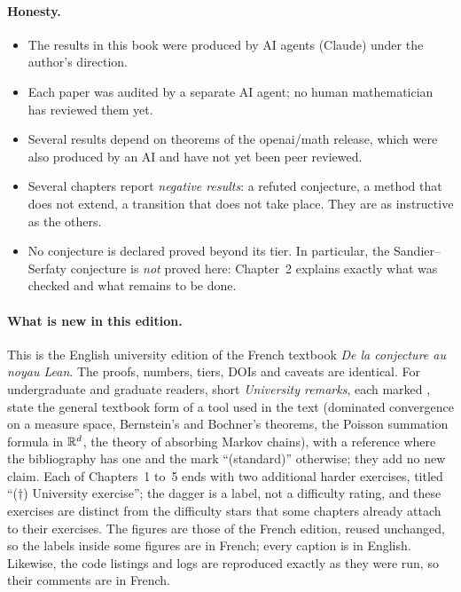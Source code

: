 \paragraph{Honesty.}
\begin{itemize}
\item The results in this book were produced by AI agents (Claude) under the author's direction.
\item Each paper was audited by a separate AI agent; no human mathematician has reviewed them yet.
\item Several results depend on theorems of the openai/math release, which were also produced by an AI and have not
yet been peer reviewed.
\item Several chapters report \emph{negative results}: a refuted conjecture, a method that does not extend, a
transition that does not take place. They are as instructive as the others.
\item No conjecture is declared proved beyond its tier. In particular, the Sandier--Serfaty conjecture is \emph{not}
proved here: Chapter~2 explains exactly what was checked and what remains to be done.
\end{itemize}

\paragraph{What is new in this edition.} This is the English university edition of the French textbook
\emph{De la conjecture au noyau Lean}. The proofs, numbers, tiers, DOIs and caveats are identical. For undergraduate
and graduate readers, short \emph{University remarks}, each marked \tierL{}, state the general textbook form of a tool
used in the text (dominated convergence on a measure space, Bernstein's and Bochner's theorems, the Poisson summation
formula in $\mathbb{R}^d$, the theory of absorbing Markov chains), with a reference where the bibliography has one and the mark ``(standard)'' otherwise; they add no new claim. Each of Chapters~1 to~5
ends with two additional harder exercises, titled ``($\dagger$) University exercise''; the dagger is a label, not a difficulty rating, and these exercises are distinct from the
difficulty stars that some chapters already attach to their exercises. The figures are those of the French edition,
reused unchanged, so the labels inside some figures are in French; every caption is in English. Likewise, the code
listings and logs are reproduced exactly as they were run, so their comments are in French.

